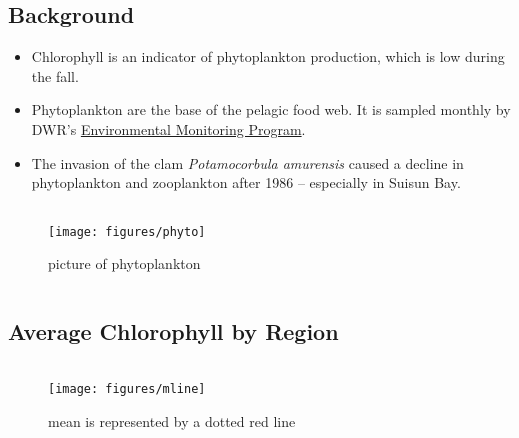 \documentclass[
]{book}
\providecommand{\tightlist}{%
  \setlength{\itemsep}{0pt}\setlength{\parskip}{0pt}}
\begin{document}
\begin{columns-nocenter}

\begin{column}

\hypertarget{background-2}{%
\subsection{Background}\label{background-2}}

\begin{itemize}
\tightlist
\item
  Chlorophyll is an indicator of phytoplankton production, which is low during the fall.
\item
  Phytoplankton are the base of the pelagic food web. It is sampled monthly by DWR's \href{https://emp.baydeltalive.com/wiki/12297}{Environmental Monitoring Program}.
\item
  The invasion of the clam \emph{Potamocorbula amurensis} caused a decline in phytoplankton and zooplankton after 1986 -- especially in Suisun Bay.
\end{itemize}

\end{column}

\begin{column}

\begin{figure}

{\centering \texttt{[image: figures/phyto]} 

}

\caption{picture of phytoplankton}\label{fig:unnamed-chunk-106}
\end{figure}

\end{column}

\end{columns-nocenter}

\hypertarget{average-chlorophyll-by-region}{%
\subsection{Average Chlorophyll by Region}\label{average-chlorophyll-by-region}}

\begin{columns-nocenter}

\begin{column}

\begin{figure}
\texttt{[image: figures/mline]} \caption{mean is represented by a dotted red line}\label{fig:unnamed-chunk-107}
\end{figure}

\end{column}

\begin{column}

\end{column}

\begin{column}

\end{column}

\end{columns-nocenter}
\end{document}
